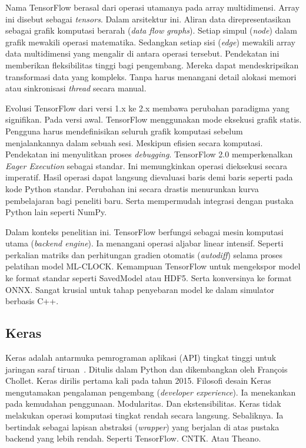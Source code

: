 Nama TensorFlow berasal dari operasi utamanya pada array multidimensi.
Array ini disebut sebagai \textit{tensors}.
Dalam arsitektur ini.
Aliran data direpresentasikan sebagai grafik komputasi berarah
(\textit{data flow graphs}).
Setiap simpul (\textit{node}) dalam grafik mewakili operasi matematika.
Sedangkan setiap sisi (\textit{edge}) mewakili array data multidimensi
yang mengalir di antara operasi tersebut.
Pendekatan ini memberikan fleksibilitas tinggi bagi pengembang.
Mereka dapat mendeskripsikan transformasi data yang kompleks.
Tanpa harus menangani detail alokasi memori atau sinkronisasi
\textit{thread} secara manual.

Evolusi TensorFlow dari versi 1.x ke 2.x membawa perubahan paradigma
yang signifikan.
Pada versi awal.
TensorFlow menggunakan mode eksekusi grafik statis.
Pengguna harus mendefinisikan seluruh grafik komputasi sebelum
menjalankannya dalam sebuah sesi.
Meskipun efisien secara komputasi.
Pendekatan ini menyulitkan proses \textit{debugging}.
TensorFlow 2.0 memperkenalkan \textit{Eager Execution} sebagai standar.
Ini memungkinkan operasi dieksekusi secara imperatif.
Hasil operasi dapat langsung dievaluasi baris demi baris seperti pada
kode Python standar.
Perubahan ini secara drastis menurunkan kurva pembelajaran bagi peneliti
baru.
Serta mempermudah integrasi dengan pustaka Python lain seperti NumPy.

Dalam konteks penelitian ini.
TensorFlow berfungsi sebagai mesin komputasi utama (\textit{backend engine}).
Ia menangani operasi aljabar linear intensif.
Seperti perkalian matriks dan perhitungan gradien otomatis
(\textit{autodiff}) selama proses pelatihan model ML-CLOCK.
Kemampuan TensorFlow untuk mengekspor model ke format standar
seperti SavedModel atau HDF5.
Serta konversinya ke format ONNX.
Sangat krusial untuk tahap penyebaran model ke dalam simulator berbasis C++.

\subsection{Keras}
Keras adalah antarmuka pemrograman aplikasi (API) tingkat tinggi untuk
jaringan saraf tiruan~\cite{chollet2015keras}.
Ditulis dalam Python dan dikembangkan oleh François Chollet.
Keras dirilis pertama kali pada tahun 2015.
Filosofi desain Keras mengutamakan pengalaman pengembang
(\textit{developer experience}).
Ia menekankan pada kemudahan penggunaan.
Modularitas.
Dan ekstensibilitas.
Keras tidak melakukan operasi komputasi tingkat rendah secara langsung.
Sebaliknya.
Ia bertindak sebagai lapisan abstraksi (\textit{wrapper}) yang berjalan
di atas pustaka backend yang lebih rendah.
Seperti TensorFlow.
CNTK.
Atau Theano.

